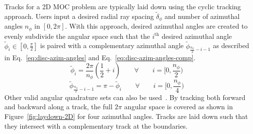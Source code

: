 Tracks for a 2D \ac{MOC} problem are typically laid down using the cyclic tracking approach. Users input a desired radial ray spacing $\tilde{\delta}_\phi$ and number of azimuthal angles $n_{\phi}$ in $[0, 2 \pi]$. With this approach, desired azimuthal angles are created to evenly subdivide the angular space such that the $i^{\text{th}}$ desired azimuthal angle $\tilde{\phi}_i \in [0, \frac{\pi}{2}]$ is paired with a complementary azimuthal angle $\tilde{\phi}_{\frac{n_{\phi}}{2} - i - 1}$ as described in Eq.~\ref{eq:disc-azim-angles} and Eq.~\ref{eq:disc-azim-angles-comp}.
\begin{equation}
\tilde{\phi}_i = \frac{2 \pi}{n_\phi} \left(\frac{1}{2} + i\right) \qquad \forall \qquad i = \Big[0,\frac{n_{\phi}}{2}\Big)
\label{eq:disc-azim-angles}
\end{equation}
\begin{equation}
\tilde{\phi}_{\frac{n_{\phi}}{2} - i - 1} = \pi - \tilde{\phi}_i \qquad \forall \qquad i= \Big[0,\frac{n_{\phi}}{4}\Big)
\label{eq:disc-azim-angles-comp}
\end{equation} 
Other valid angular quadrature sets can also be used~\cite{liu_mrt}. By tracking both forward and backward along a track, the full $2 \pi$ angular space is covered as shown in Figure~\ref{fig:laydown-2D} for four azimuthal angles. Tracks are laid down such that they intersect with a complementary track at the boundaries. 

